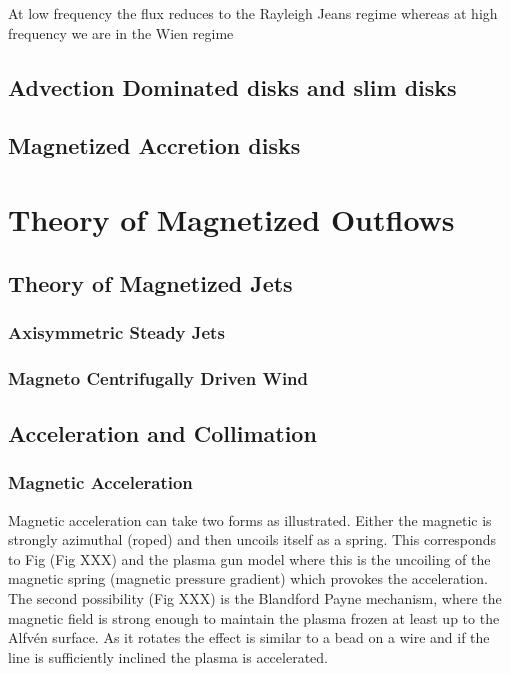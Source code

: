 \documentclass[10pt,a4paper,english]{article}
\begin{document}
At low frequency the flux reduces to the Rayleigh Jeans regime whereas at
high frequency we are in the Wien regime


\subsection{Advection Dominated disks and slim disks}
\subsection{Magnetized Accretion disks}

\section{Theory of Magnetized Outflows}
\subsection{Theory of Magnetized Jets}
\subsubsection{Axisymmetric Steady Jets}
\subsubsection{Magneto Centrifugally Driven Wind}
\subsection{Acceleration and Collimation}
\subsubsection{Magnetic Acceleration}

Magnetic acceleration can take two forms as illustrated. Either the magnetic is strongly
azimuthal (roped) and then uncoils itself as a spring. This corresponds to Fig (Fig XXX)
and the plasma gun model where this is the uncoiling of the magnetic spring (magnetic pressure gradient)
which provokes the acceleration. The second possibility (Fig XXX) is the Blandford Payne mechanism, where the magnetic field
is strong enough to maintain the plasma frozen at least up to the Alfvén surface. As it rotates the effect is similar to a bead
on a wire and if the line is sufficiently inclined the plasma is accelerated.

\end{document}
